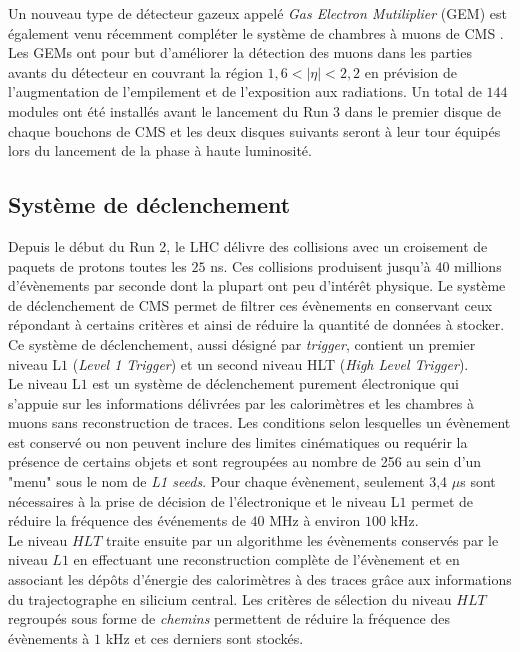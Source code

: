 Un nouveau type de détecteur gazeux appelé \textit{Gas Electron Mutiliplier} (GEM) est également venu récemment compléter le système de chambres à muons de CMS \cite{GEM1,GEM2}. Les GEMs ont pour but d'améliorer la détection des muons dans les parties avants du détecteur en couvrant la région $1,6<|\eta|<2,2$ en prévision de l'augmentation de l'empilement et de l'exposition aux radiations. Un total de $144$ modules ont été installés avant le lancement du Run 3 dans le premier disque de chaque bouchons de CMS et les deux disques suivants seront à leur tour équipés lors du lancement de la phase à haute luminosité. 

\subsection{Système de déclenchement}

Depuis le début du Run 2, le LHC délivre des collisions avec un croisement de paquets de protons toutes les $25$ ns. Ces collisions produisent jusqu'à $40$ millions d'évènements par seconde dont la plupart ont peu d'intérêt physique. Le système de déclenchement de CMS permet de filtrer ces évènements en conservant ceux répondant à certains critères et ainsi de réduire la quantité de données à stocker. Ce système de déclenchement, aussi désigné par \textit{trigger}, contient un premier niveau L$1$ (\textit{Level 1 Trigger}) et un second niveau HLT (\textit{High Level Trigger}). \\

Le niveau L$1$ est un système de déclenchement purement électronique qui s'appuie sur les informations délivrées par les calorimètres et les chambres à muons sans reconstruction de traces. Les conditions selon lesquelles un évènement est conservé ou non peuvent inclure des limites cinématiques ou requérir la présence de certains objets et sont regroupées au nombre de 256 au sein d'un "menu" sous le nom de \textit{L1 seeds}. Pour chaque évènement, seulement 3,4 $\mu$s sont nécessaires à la prise de décision de l'électronique et le niveau L$1$ permet de réduire la fréquence des événements de $40$ MHz à environ $100$ kHz. \\

Le niveau $HLT$ traite ensuite par un algorithme les évènements conservés par le niveau $L1$ en effectuant une reconstruction complète de l'évènement et en associant les dépôts d'énergie des calorimètres à des traces grâce aux informations du trajectographe en silicium central. Les critères de sélection du niveau $HLT$ regroupés sous forme de \textit{chemins} permettent de réduire la fréquence des évènements à $1$ kHz et ces derniers sont stockés. \\